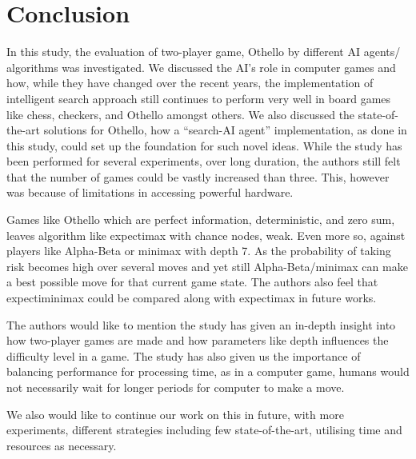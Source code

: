 \documentclass{svproc}
\begin{document}
\section{Conclusion}\label{5}

In this study, the evaluation of two-player game, Othello by different AI agents/ algorithms was investigated. We discussed the AI's role in computer games and how, while they have changed over the recent years, the implementation of intelligent search approach still continues to perform very well in board games like chess, checkers, and Othello amongst others. We also discussed the state-of-the-art solutions for Othello, how a “search-AI agent” implementation, as done in this study, could set up the foundation for such novel ideas.
While the study has been performed for several experiments, over long duration, the authors still felt that the number of games could be vastly increased than three. This, however was because of limitations in accessing powerful hardware.

Games like Othello which are perfect information, deterministic, and zero sum, leaves algorithm like expectimax with chance nodes, weak. Even more so, against players like Alpha-Beta or minimax with depth 7. As the probability of taking risk becomes high over several moves and yet still Alpha-Beta/minimax can make a best possible move for that current game state. The authors also feel that expectiminimax could be compared along with expectimax in future works.

The authors would like to mention the study has given an in-depth insight into how two-player games are made and how parameters like depth influences the difficulty level in a game. The study has also given us the importance of balancing performance for processing time, as in a computer game, humans would not necessarily wait for longer periods for computer to make a move.

We also would like to continue our work on this in future, with more experiments, different strategies including few state-of-the-art, utilising time and resources as necessary.
\end{document}
